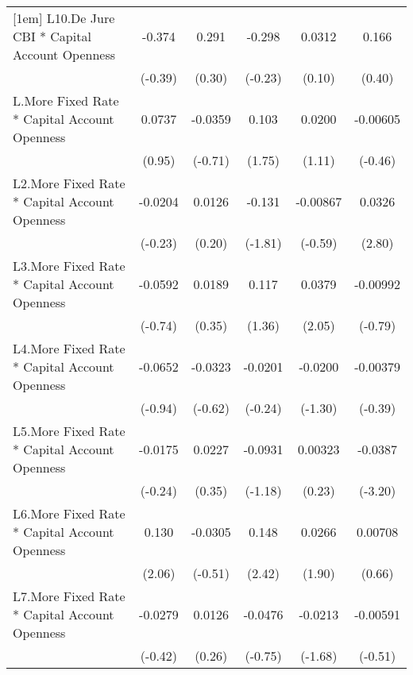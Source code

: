 {\begin{longtable}{l*{5}{c}}
[1em]
L10.De Jure CBI * Capital Account Openness&   -0.374         &    0.291         &   -0.298         &   0.0312         &    0.166         \\
                &  (-0.39)         &   (0.30)         &  (-0.23)         &   (0.10)         &   (0.40)         \\
[1em]
L.More Fixed Rate * Capital Account Openness&   0.0737         &  -0.0359         &    0.103         &   0.0200         & -0.00605         \\
                &   (0.95)         &  (-0.71)         &   (1.75)         &   (1.11)         &  (-0.46)         \\
[1em]
L2.More Fixed Rate * Capital Account Openness&  -0.0204         &   0.0126         &   -0.131         & -0.00867         &   0.0326\sym{**} \\
                &  (-0.23)         &   (0.20)         &  (-1.81)         &  (-0.59)         &   (2.80)         \\
[1em]
L3.More Fixed Rate * Capital Account Openness&  -0.0592         &   0.0189         &    0.117         &   0.0379\sym{*}  & -0.00992         \\
                &  (-0.74)         &   (0.35)         &   (1.36)         &   (2.05)         &  (-0.79)         \\
[1em]
L4.More Fixed Rate * Capital Account Openness&  -0.0652         &  -0.0323         &  -0.0201         &  -0.0200         & -0.00379         \\
                &  (-0.94)         &  (-0.62)         &  (-0.24)         &  (-1.30)         &  (-0.39)         \\
[1em]
L5.More Fixed Rate * Capital Account Openness&  -0.0175         &   0.0227         &  -0.0931         &  0.00323         &  -0.0387\sym{**} \\
                &  (-0.24)         &   (0.35)         &  (-1.18)         &   (0.23)         &  (-3.20)         \\
[1em]
L6.More Fixed Rate * Capital Account Openness&    0.130\sym{*}  &  -0.0305         &    0.148\sym{*}  &   0.0266         &  0.00708         \\
                &   (2.06)         &  (-0.51)         &   (2.42)         &   (1.90)         &   (0.66)         \\
[1em]
L7.More Fixed Rate * Capital Account Openness&  -0.0279         &   0.0126         &  -0.0476         &  -0.0213         & -0.00591         \\
                &  (-0.42)         &   (0.26)         &  (-0.75)         &  (-1.68)         &  (-0.51)         \\

\end{longtable}}
